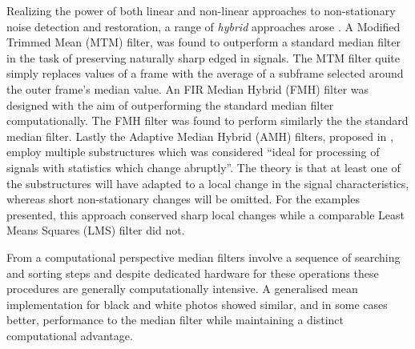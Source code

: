 Realizing the power of both linear and non-linear approaches to non-stationary noise detection and restoration, a range of \emph{hybrid} approaches arose\cite{Nieminen1987a}\cite{Lee1985} \cite{Heinonen1987}. A Modified Trimmed Mean (MTM) filter, was found to outperform a standard median filter in the task of preserving naturally sharp edged in signals\cite{Lee1985}. The MTM filter quite simply replaces values of a frame with the average of a subframe selected around the outer frame's median value\cite{Lee1985}. An FIR Median Hybrid (FMH) filter was designed with the aim of outperforming the standard median filter computationally. The FMH filter was found to perform similarly the the standard median filter\cite{Heinonen1987}. Lastly the Adaptive Median Hybrid (AMH) filters, proposed in \cite{Nieminen1987a}, employ multiple substructures which was considered ``ideal for processing of signals with statistics which change abruptly''. The theory is that at least one of the substructures will have adapted to a local change in the signal characteristics, whereas short non-stationary changes will be omitted. For the examples presented, this approach conserved sharp local changes while a comparable Least Means Squares (LMS) filter did not\cite{Nieminen1987a}.

From a computational perspective median filters involve a sequence of searching and sorting steps and despite dedicated hardware for these operations these procedures are generally computationally intensive\cite{Kundu1984}. A generalised mean implementation for black and white photos showed similar, and in some cases better, performance to the median filter while maintaining a distinct computational advantage\cite{Kundu1984}.




